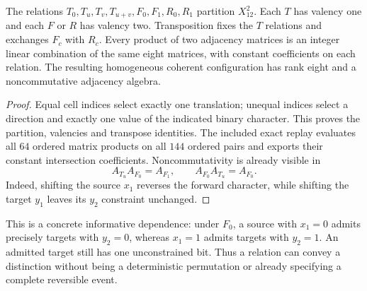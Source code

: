 \begin{proposition}\label{prop:rank8}
The relations $T_0,T_u,T_v,T_{u+v},F_0,F_1,R_0,R_1$ partition $X_{12}^2$. Each $T$ has valency one and each $F$ or $R$ has valency two. Transposition fixes the $T$ relations and exchanges $F_c$ with $R_c$. Every product of two adjacency matrices is an integer linear combination of the same eight matrices, with constant coefficients on each relation. The resulting homogeneous coherent configuration has rank eight and a noncommutative adjacency algebra.
\end{proposition}
\begin{proof}
Equal cell indices select exactly one translation; unequal indices select a direction and exactly one value of the indicated binary character. This proves the partition, valencies and transpose identities. The included exact replay evaluates all $64$ ordered matrix products on all $144$ ordered pairs and exports their constant intersection coefficients. Noncommutativity is already visible in
\begin{equation}
A_{T_u}A_{F_0}=A_{F_1},
\qquad A_{F_0}A_{T_u}=A_{F_0}.
\tag{K3}\label{eq:noncommutativewitness}
\end{equation}
Indeed, shifting the source $x_1$ reverses the forward character, while shifting the target $y_1$ leaves its $y_2$ constraint unchanged.
\end{proof}

This is a concrete informative dependence: under $F_0$, a source with $x_1=0$ admits precisely targets with $y_2=0$, whereas $x_1=1$ admits targets with $y_2=1$. An admitted target still has one unconstrained bit. Thus a relation can convey a distinction without being a deterministic permutation or already specifying a complete reversible event.

